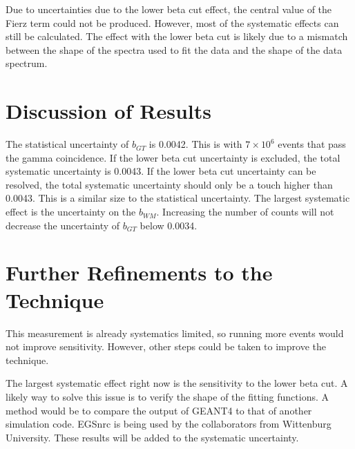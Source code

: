 \documentclass[../MaxHughesThesis.tex]{subfiles}
\begin{document}
Due to uncertainties due to the lower beta cut effect, the central value of the Fierz term could not be produced. 
However, most of the systematic effects can still be calculated.
The effect with the lower beta cut is likely due to a mismatch between the shape of the spectra used to fit the data and the shape of the data spectrum.

\section{Discussion of Results}

The statistical uncertainty of $b_{GT}$ is 0.0042.
This is with $7 \times 10^{6}$ events that pass the gamma coincidence.
If the lower beta cut uncertainty is excluded, the total systematic uncertainty is 0.0043.
If the lower beta cut uncertainty can be resolved, the total systematic uncertainty should only be a touch higher than 0.0043.
This is a similar size to the statistical uncertainty.
The largest systematic effect is the uncertainty on the $b_{WM}$.
Increasing the number of counts will not decrease the uncertainty of $b_{GT}$ below 0.0034.


\section{Further Refinements to the Technique}
This measurement is already systematics limited, so running more events would not improve sensitivity.
However, other steps could be taken to improve the technique.

The largest systematic effect right now is the sensitivity to the lower beta cut. 
A likely way to solve this issue is to verify the shape of the fitting functions. 
A method would be to compare the output of GEANT4 to that of another simulation code.
EGSnrc is being used by the collaborators from Wittenburg University. 
These results will be added to the systematic uncertainty.
\end{document}
